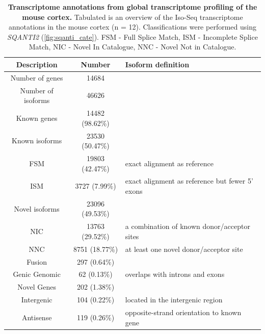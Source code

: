 \vspace{0.7cm}
\begin{table}[!h]
    \setlength\tabcolsep{6pt} %
	\caption[Transcriptome annotations from global transcriptome profiling]%
	{\textbf{Transcriptome annotations from global transcriptome profiling of the mouse cortex.} Tabulated is an overview of the Iso-Seq transcriptome annotations in the mouse cortex (n = 12). Classifications were performed using \textit{SQANTI2} (\cref{fig:sqanti_cate}). FSM - Full Splice Match, ISM - Incomplete Splice Match, NIC - Novel In Catalogue, NNC - Novel Not in Catalogue.}
	\label{tab:sqanti_output_whole}
	\begin{tabularx}{1\textwidth}{ccl}
		\toprule
		Description              & \multicolumn{1}{c}{Number} & Isoform definition               \\ \midrule
		Number of genes    & 14684                      &                                  \\
		Number of isoforms & 46626                      &                                  \\
		Known genes          & 14482 (98.62\%)            &                                  \\
		\hspace{3mm}Known isoforms       & 23530 (50.47\%)            &                                  \\
		\hspace{6mm}FSM          & 19803 (42.47\%) & exact alignment as reference  \\
		\hspace{6mm}ISM  & 3727 (7.99\%)   & exact alignment as reference but fewer 5’ exons       \\
		\hspace{3mm}Novel isoforms           & 23096 (49.53\%)            &                                  \\
		\hspace{6mm}NIC      & 13763 (29.52\%) & a combination of known donor/acceptor sites                    \\
		\hspace{6mm}NNC   & 8751 (18.77\%)  & at least one novel donor/acceptor site    \\
		\hspace{6mm}Fusion                   & 297 (0.64\%)               &                                  \\
		\hspace{6mm}Genic Genomic            & 62 (0.13\%)                & overlaps with introns and exons  \\
		Novel Genes              & 202 (1.38\%)               &                                  \\
		\hspace{6mm}Intergenic               & 104 (0.22\%)               & located in the intergenic region \\
		\hspace{6mm}Antisense                     & 119 (0.26\%)    & opposite-strand orientation to known gene           \\ \bottomrule
	\end{tabularx}
\end{table}


